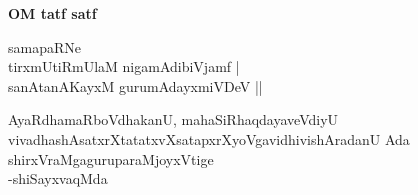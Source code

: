 \begin{center}
{\bfseries{OM tatf satf}}
\end{center}

\newpage

\thispagestyle{empty}
\begin{center}
{\large samapaRNe\\
tirxmUtiRmUlaM nigamAdibiVjamf |\\
sanAtanAKayxM gurumAdayxmiVDeV ||

\medskip
AyaRdhamaRboVdhakanU, mahaSiRhaqdayaveVdiyU\\
vivadhashAsatxrXtatatxvXsatapxrXyoVgavidhivishAradanU Ada\\
shirxVraMgaguruparaMjoyxVtige\\
\hfill{-shiSayxvaqMda}}
\end{center}
